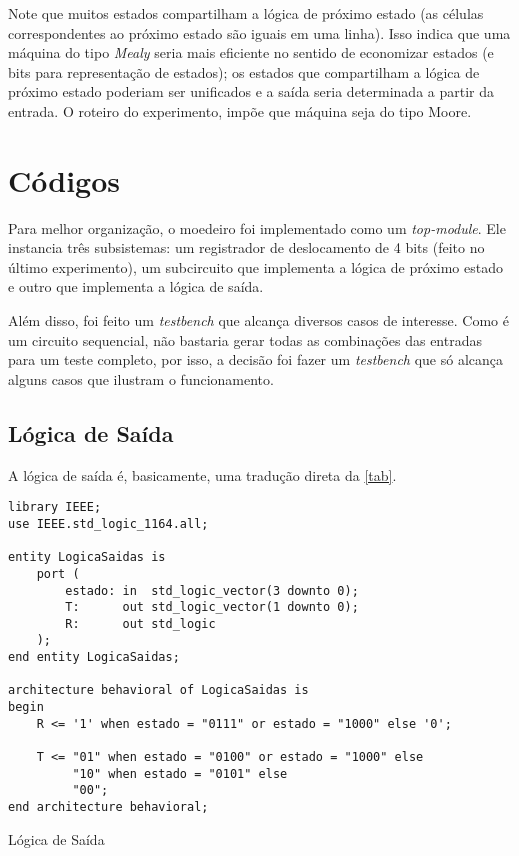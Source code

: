 \documentclass[a4paper,12pt]{article}
\newenvironment{code}{\captionsetup{type=listing}}{}
\begin{document}
Note que muitos estados compartilham a lógica de próximo estado (as células correspondentes ao próximo estado são iguais em uma linha). Isso indica que uma máquina do tipo \textit{Mealy} seria mais eficiente no sentido de economizar estados (e bits para representação de estados); os estados que compartilham a lógica de próximo estado poderiam ser unificados e a saída seria determinada a partir da entrada. O roteiro do experimento, impõe que máquina seja do tipo Moore.

\newpage

\section{Códigos} \label{sec: codigos}
Para melhor organização, o moedeiro foi implementado como um \textit{top-module}. Ele instancia três subsistemas: um registrador de deslocamento de 4 bits (feito no último experimento), um subcircuito que implementa a lógica de próximo estado e outro que implementa a lógica de saída.

Além disso, foi feito um \textit{testbench} que alcança diversos casos de interesse. Como é um circuito sequencial, não bastaria gerar todas as combinações das entradas para um teste completo, por isso, a decisão foi fazer um \textit{testbench} que só alcança alguns casos que ilustram o funcionamento.

\subsection{Lógica de Saída}
A lógica de saída é, basicamente, uma tradução direta da \autoref{tab}.
\begin{code}
    \begin{verbatim}
library IEEE;
use IEEE.std_logic_1164.all;

entity LogicaSaidas is
    port (
        estado: in  std_logic_vector(3 downto 0);
        T:      out std_logic_vector(1 downto 0);
        R:      out std_logic
    );
end entity LogicaSaidas;

architecture behavioral of LogicaSaidas is
begin
    R <= '1' when estado = "0111" or estado = "1000" else '0';

    T <= "01" when estado = "0100" or estado = "1000" else
         "10" when estado = "0101" else
         "00";
end architecture behavioral;
    \end{verbatim}
    \caption{Lógica de Saída}
\end{code}
\end{document}
